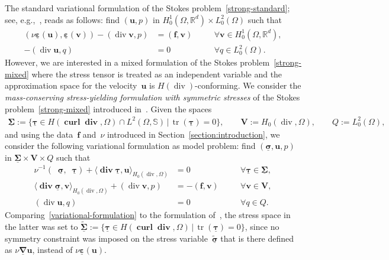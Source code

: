 \documentclass[a4paper,twoside,10pt]{article}
\theoremstyle{plain}
\theoremstyle{remark}
\theoremstyle{definition}
\numberwithin{equation}{section}
\numberwithin{figure}{section}
\newcommand{\Sbb}{\mathbb{S}}
\newcommand{\Rbbd}{\mathbb{R}^d}
\newcommand{\taubf}{\underline{\boldsymbol{\tau}}}
\newcommand{\vbf}{\mathbf{v}}
\newcommand{\sigmabf}{\underline{\boldsymbol{\sigma}}}
\newcommand{\ubf}{\mathbf{u}}
\DeclareMathOperator{\dive}{div}
\DeclareMathOperator{\divebf}{\mathbf{div}}
\DeclareMathOperator{\dev}{\underline{\mathbf{dev}}}
\DeclareMathOperator{\curlbf}{\mathbf{curl}}
\DeclareMathOperator{\tr}{tr}
\newcommand{\Ltwo}{L^2}
\newcommand{\LtwozeroOmega}{\Ltwo_0(\Omega)}
\newcommand{\Hcurldivbf}{H(\curlbf\divebf,\Omega)}
\newcommand{\Hzerodiv}{H_0(\dive,\Omega)}
\newcommand{\fbf}{\mathbf{f}}
\newcommand{\numo}{\nu^{-1}}
\newcommand{\epsbfun}{\underline{\boldsymbol{\varepsilon}}}
\newcommand{\nablabfun}{\underline{\boldsymbol{\nabla}}}
\newcommand{\Sigmabf}{\underline{\boldsymbol{\Sigma}}}
\newcommand{\Vbf}{\mathbf{V}}
\begin{document}
The standard variational formulation of the Stokes problem~\eqref{strong-standard}; see, e.g.,~\cite{Girault-Raviart:1986},
reads as follows:
find $(\ubf, p)$ in $H^1_0(\Omega,\Rbbd) \times \LtwozeroOmega$ such that
\begin{subequations} \label{variational-standard}
\begin{alignat}{2}
(\nu \epsbfun(\ubf),\epsbfun(\vbf)) -(\dive\vbf,p) &= (\fbf,\vbf) \quad &&\forall \vbf \in H^1_0(\Omega,\Rbbd),\ \\
- (\dive\ubf,q) &= 0 \quad &&\forall q \in \LtwozeroOmega.
\end{alignat}
\end{subequations}
However,
we are interested in a mixed formulation of the Stokes problem~\eqref{strong-mixed}
where the stress tensor is treated as an independent variable
and the approximation space for the velocity~$\ubf$ is $H(\dive)$-conforming.
We consider the \emph{mass-conserving stress-yielding formulation with symmetric stresses} of the Stokes problem~\eqref{strong-mixed}
introduced in~\cite{Gopalakrishnan-Lederer-Schoberl:2020-b}.
Given the spaces
\begin{align*}
\Sigmabf := \{ \taubf \in \Hcurldivbf \cap \Ltwo(\Omega,\Sbb) \, | \, \tr(\taubf) = 0\},
\qquad
\Vbf      := \Hzerodiv,
\qquad
Q      := \LtwozeroOmega,
\end{align*}
and using the data~$\fbf$ and~$\nu$ introduced in Section~\ref{section:introduction},
we consider the following variational formulation as model problem:
find $(\sigmabf, \ubf, p)$ in $\Sigmabf \times \Vbf \times Q$ such that
\begin{subequations} \label{variational-formulation}
\begin{alignat}{2}
\numo( \dev\sigmabf,\dev\taubf) + \langle\divebf\taubf,\ubf\rangle_{\Hzerodiv}   &= 0             &&\quad\forall \taubf \in \Sigmabf,\ \\
\langle\divebf\sigmabf,\vbf\rangle_{\Hzerodiv} + (\dive\vbf,p)                   &= -(\fbf,\vbf)  &&\quad\forall \vbf \in \Vbf,\        \\
(\dive\ubf,q)                                                                    &= 0             &&\quad\forall q \in Q.
\end{alignat}
\end{subequations}
Comparing~\eqref{variational-formulation}
to the formulation of~\cite{Gopalakrishnan-Lederer-Schoberl:2020},
the stress space in the latter was set to $\widetilde{\Sigmabf} := \{ \taubf \in \Hcurldivbf \, | \, \tr(\taubf) = 0\}$,
since no symmetry constraint was imposed on the stress variable~$\widetilde{\sigmabf}$
that is there defined as $\nu\nablabfun \ubf$,
instead of $\nu\epsbfun(\ubf)$.
\end{document}
